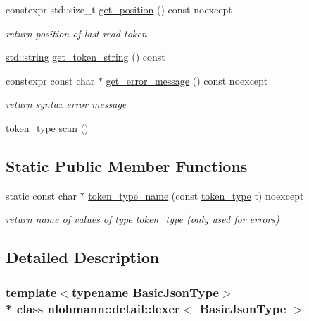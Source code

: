 \begin{DoxyCompactItemize}
constexpr std\+::size\+\_\+t \hyperlink{classnlohmann_1_1detail_1_1lexer_a2a00465a3d5d70c84809cdb27658db79}{get\+\_\+position} () const noexcept
\begin{DoxyCompactList}\small\item\em return position of last read token \end{DoxyCompactList}\item 
\hyperlink{namespacenlohmann_1_1detail_a90aa5ef615aa8305e9ea20d8a947980fab45cffe084dd3d20d928bee85e7b0f21}{std\+::string} \hyperlink{classnlohmann_1_1detail_1_1lexer_a6d8a58be845717a86726756372414cbb}{get\+\_\+token\+\_\+string} () const 
\item 
constexpr const char $\ast$ \hyperlink{classnlohmann_1_1detail_1_1lexer_a53cebbc684ef97fa49651eb442d58f86}{get\+\_\+error\+\_\+message} () const noexcept
\begin{DoxyCompactList}\small\item\em return syntax error message \end{DoxyCompactList}\item 
\hyperlink{classnlohmann_1_1detail_1_1lexer_a3f313cdbe187cababfc5e06f0b69b098}{token\+\_\+type} \hyperlink{classnlohmann_1_1detail_1_1lexer_aac3041cd2b9291e64fee38db422863c9}{scan} ()
\end{DoxyCompactItemize}
\subsection*{Static Public Member Functions}
\begin{DoxyCompactItemize}
\item 
static const char $\ast$ \hyperlink{classnlohmann_1_1detail_1_1lexer_ae514e2005f0ce185f1ad366139e541e8}{token\+\_\+type\+\_\+name} (const \hyperlink{classnlohmann_1_1detail_1_1lexer_a3f313cdbe187cababfc5e06f0b69b098}{token\+\_\+type} t) noexcept
\begin{DoxyCompactList}\small\item\em return name of values of type token\+\_\+type (only used for errors) \end{DoxyCompactList}\end{DoxyCompactItemize}


\subsection{Detailed Description}
\subsubsection*{template$<$typename Basic\+Json\+Type$>$\\*
class nlohmann\+::detail\+::lexer$<$ Basic\+Json\+Type $>$}

